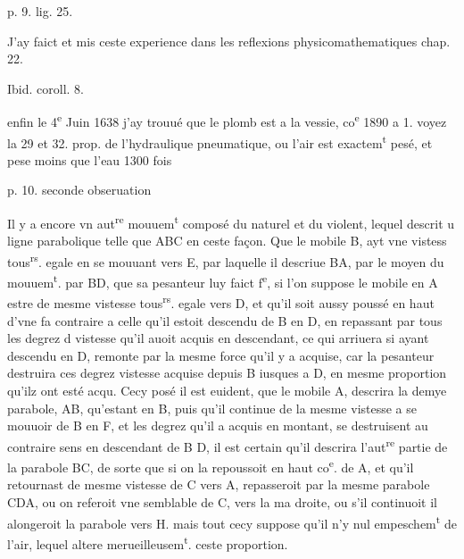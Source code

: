 \documentclass[11pt,a4paper]{article}
\begin{document}
p. 9. lig. 25.

J'ay faict et mis ceste experience dans les reflexions physicomathematiques \ill{} chap. 22.

Ibid. coroll. 8.

enfin le 4\textsuperscript{e} Juin 1638 j'ay trouué que le plomb est a la vessie, co\textsuperscript{e} 1890 a 1. voyez la 29 et 32. prop. de l'hydraulique pneumatique, ou l'air est exactem\textsuperscript{t} pesé, et \ill{} pese moins que l'eau 1300 fois

p. 10. seconde obseruation

Il y a encore vn aut\textsuperscript{re} mouuem\textsuperscript{t} composé du naturel et du violent, lequel descrit u ligne parabolique telle que ABC en ceste façon. Que le mobile B, ayt vne vistess tous\textsuperscript{rs}. egale en se mouuant vers E, par laquelle il descriue BA, par le moyen du mouuem\textsuperscript{t}. par BD, que sa pesanteur luy faict f\textsuperscript{e}, si l'on suppose le mobile en A estre de mesme vistesse tous\textsuperscript{rs}. egale vers D, et qu'il soit aussy poussé en haut d'vne fa contraire a celle qu'il estoit descendu de B en D, en repassant par tous les degrez d vistesse qu'il auoit acquis en descendant, ce qui arriuera si ayant descendu en D, \ill{} remonte par la mesme force qu'il y a acquise, car la pesanteur destruira ces degrez \ill{} vistesse acquise depuis B iusques a D, en mesme proportion qu'ilz ont esté acqu. Cecy posé il est euident, que le mobile A, descrira la demye parabole,  AB, qu'estant en B, puis qu'il continue de la mesme vistesse a se mouuoir de B en F, et \ill{} les degrez qu'il a acquis en montant, se destruisent au contraire sens en descendant de B \ill{} D, il est certain qu'il  descrira l'aut\textsuperscript{re} partie de la parabole BC, de sorte que si on la repoussoit en haut co\textsuperscript{e}. de A, et qu'il retournast de mesme vistesse de C vers A, \ill{} repasseroit par la mesme parabole CDA, ou on referoit vne semblable de C, vers la ma droite, ou s'il continuoit il alongeroit la parabole vers H. mais tout cecy suppose qu'il n'y \ill{} nul empeschem\textsuperscript{t} de l'air, lequel altere merueilleusem\textsuperscript{t}. ceste proportion.
\end{document}
